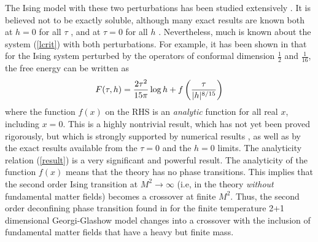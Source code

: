 \documentclass[a4paper,aps,prd,superscriptaddress,showpacs,showkeys]{revtex4}
\begin{document}
The Ising model with these two perturbations has
been studied extensively \cite{mccoy,delfino1,zamolodchikov}. 
It is believed not
to be exactly soluble, although many exact results are known both at $h=0$
for all
$\tau$
\cite{onsager}, and at $\tau=0$ for all $h$ \cite{magfield,delfino2,caselle}.
Nevertheless, much is known about the system (\ref{lcrit}) with both
perturbations. For example, it has been shown in \cite{zamolodchikov}
that
for the Ising system perturbed by the operators of
conformal dimension
$\frac{1}{2}$ and $\frac{1}{16}$, the free energy can be written as
\begin{eqnarray}F(\tau,h)={2\tau^2\over 15\pi}\log h+
f\left({\tau\over |h|^{8/15}}\right)
\label{result}
\end{eqnarray}
where the function $f(x)$ on the RHS is an {\it analytic}
function for all real
$x$, including $x=0$. This is a highly nontrivial result, which has not
yet been proved rigorously, but which is strongly supported by  numerical
results \cite{zamolodchikov}, as well as by the exact results available
from the $\tau=0$ and the $h=0$ limits. The analyticity relation
(\ref{result}) is a very significant and powerful result.  The
analyticity
of the function $f(x)$ means that the theory has no phase transitions.
This
implies that the second order Ising transition at $M^2\to\infty$ (i.e,
in the theory {\it without} fundamental matter fields) becomes a
crossover
at finite $M^2$. Thus, the second order deconfining phase transition
found
in \cite{gg1} for the finite temperature 2+1 dimensional Georgi-Glashow
model changes into a crossover with the inclusion of fundamental
matter fields that have a heavy but finite mass.
\end{document}
